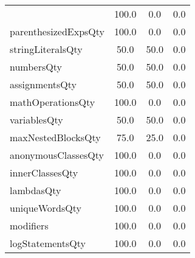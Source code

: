 \begin{tabular}{lccc}
{tryCatchQty & 100.0 & 0.0 & 0.0 \\
parenthesizedExpsQty & 100.0 & 0.0 & 0.0 \\
stringLiteralsQty & 50.0 & 50.0 & 0.0 \\
numbersQty & 50.0 & 50.0 & 0.0 \\
assignmentsQty & 50.0 & 50.0 & 0.0 \\
mathOperationsQty & 100.0 & 0.0 & 0.0 \\
variablesQty & 50.0 & 50.0 & 0.0 \\
maxNestedBlocksQty & 75.0 & 25.0 & 0.0 \\
anonymousClassesQty & 100.0 & 0.0 & 0.0 \\
innerClassesQty & 100.0 & 0.0 & 0.0 \\
lambdasQty & 100.0 & 0.0 & 0.0 \\
uniqueWordsQty & 100.0 & 0.0 & 0.0 \\
modifiers & 100.0 & 0.0 & 0.0 \\
logStatementsQty & 100.0 & 0.0 & 0.0 \\
\bottomrule
              \end{tabular}
            
